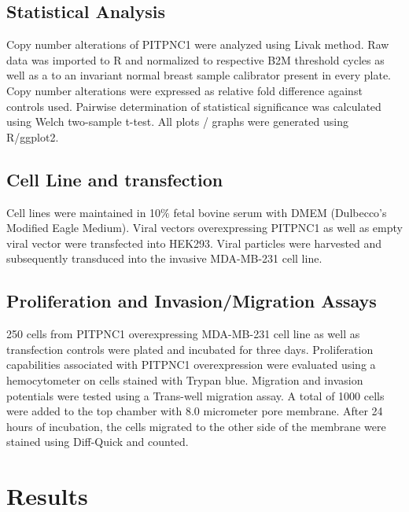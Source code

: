 \documentclass[10pt,letterpaper]{article}
\begin{document}
\subsection*{Statistical Analysis}
Copy number alterations of PITPNC1 were analyzed using Livak method. Raw data was imported to R and normalized to respective B2M threshold cycles as well as a to an invariant normal breast sample calibrator present in every plate. Copy number alterations were expressed as relative fold difference against controls used. Pairwise determination of statistical significance was calculated using Welch two-sample t-test. All plots / graphs were generated using R/ggplot2.

\subsection*{Cell Line and transfection}
Cell lines were maintained in 10$\%$ fetal bovine serum with DMEM (Dulbecco’s Modified Eagle Medium). Viral vectors overexpressing PITPNC1 as well as empty viral vector were transfected into HEK293. Viral particles were harvested and subsequently transduced into the invasive MDA-MB-231 cell line.

\subsection*{Proliferation and Invasion/Migration Assays}
250 cells from PITPNC1 overexpressing MDA-MB-231 cell line as well as transfection controls were plated and incubated for three days. Proliferation capabilities associated with PITPNC1 overexpression were evaluated using a hemocytometer on cells stained with Trypan blue. Migration and invasion potentials were tested using a Trans-well migration assay. A total of 1000 cells were added to the top chamber with 8.0 micrometer pore membrane. After 24 hours of incubation, the cells migrated to the other side of the membrane were stained using Diff-Quick and counted.

\newpage
\section*{Results}
\end{document}
